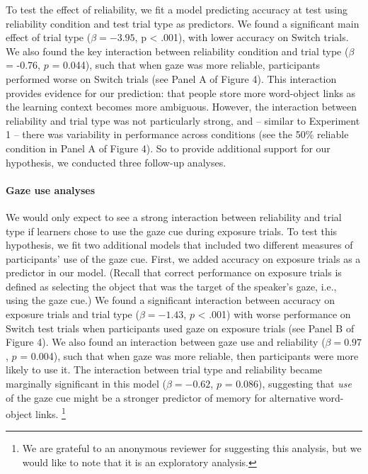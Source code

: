 \documentclass[authoryear, review]{elsarticle}
\begin{document}
To test the effect of reliability, we fit a model predicting accuracy at
test using reliability condition and test trial type as predictors. We
found a significant main effect of trial type (\(\beta = -3.95\), p
\textless{} .001), with lower accuracy on Switch trials. We also found
the key interaction between reliability condition and trial type
(\(\beta\) = -0.76, \(p\) = 0.044), such that when gaze was more
reliable, participants performed worse on Switch trials (see Panel A of
Figure 4). This interaction provides evidence for our prediction: that
people store more word-object links as the learning context becomes more
ambiguous. However, the interaction between reliability and trial type
was not particularly strong, and -- similar to Experiment 1 -- there was
variability in performance across conditions (see the 50\% reliable
condition in Panel A of Figure 4). So to provide additional support for
our hypothesis, we conducted three follow-up analyses.

\paragraph{Gaze use analyses}\label{gaze-use-analyses}

We would only expect to see a strong interaction between reliability and
trial type if learners chose to use the gaze cue during exposure trials.
To test this hypothesis, we fit two additional models that included two
different measures of participants' use of the gaze cue. First, we added
accuracy on exposure trials as a predictor in our model. (Recall that
correct performance on exposure trials is defined as selecting the
object that was the target of the speaker's gaze, i.e., using the gaze
cue.) We found a significant interaction between accuracy on exposure
trials and trial type (\(\beta = -1.43\), \(p\) \textless{} .001) with
worse performance on Switch test trials when participants used gaze on
exposure trials (see Panel B of Figure 4). We also found an interaction
between gaze use and reliability (\(\beta = 0.97\), \(p\) = 0.004), such
that when gaze was more reliable, then participants were more likely to
use it. The interaction between trial type and reliability became
marginally significant in this model (\(\beta = -0.62\), \(p\) = 0.086),
suggesting that \emph{use} of the gaze cue might be a stronger predictor
of memory for alternative word-object links.
\footnote{We are grateful to an anonymous reviewer for suggesting this analysis, but we would like to note that it is an exploratory analysis.}
\end{document}

